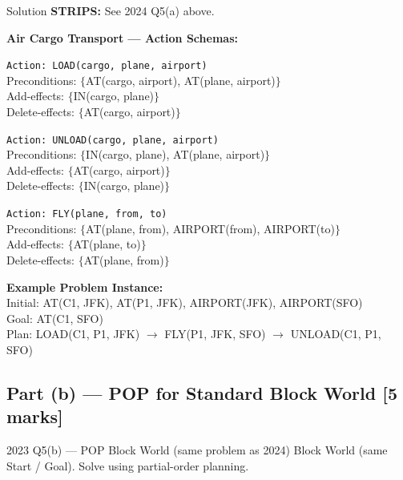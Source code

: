 \documentclass[12pt,a4paper]{article}
\begin{document}
\begin{solbox}{Solution}
\textbf{STRIPS:} See 2024 Q5(a) above.

\textbf{Air Cargo Transport --- Action Schemas:}

\medskip
\texttt{Action: LOAD(cargo, plane, airport)}\\
\phantom{xxx}Preconditions: $\{$AT(cargo, airport), AT(plane, airport)$\}$\\
\phantom{xxx}Add-effects: $\{$IN(cargo, plane)$\}$\\
\phantom{xxx}Delete-effects: $\{$AT(cargo, airport)$\}$

\medskip
\texttt{Action: UNLOAD(cargo, plane, airport)}\\
\phantom{xxx}Preconditions: $\{$IN(cargo, plane), AT(plane, airport)$\}$\\
\phantom{xxx}Add-effects: $\{$AT(cargo, airport)$\}$\\
\phantom{xxx}Delete-effects: $\{$IN(cargo, plane)$\}$

\medskip
\texttt{Action: FLY(plane, from, to)}\\
\phantom{xxx}Preconditions: $\{$AT(plane, from), AIRPORT(from), AIRPORT(to)$\}$\\
\phantom{xxx}Add-effects: $\{$AT(plane, to)$\}$\\
\phantom{xxx}Delete-effects: $\{$AT(plane, from)$\}$

\medskip
\textbf{Example Problem Instance:}\\
Initial: AT(C1, JFK), AT(P1, JFK), AIRPORT(JFK), AIRPORT(SFO)\\
Goal: AT(C1, SFO)\\
Plan: LOAD(C1, P1, JFK) $\rightarrow$ FLY(P1, JFK, SFO) $\rightarrow$ UNLOAD(C1, P1, SFO)
\end{solbox}

\subsection{Part (b) --- POP for Standard Block World [5 marks]}

\begin{qbox}{2023 Q5(b) --- POP Block World (same problem as 2024)}
Block World (same Start / Goal). Solve using partial-order planning.
\end{qbox}
\end{document}
